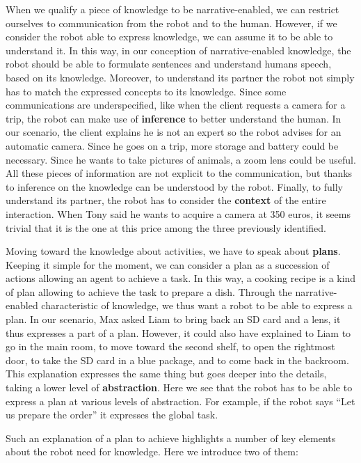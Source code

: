 When we qualify a piece of knowledge to be narrative-enabled, we can restrict ourselves to communication from the robot and to the human. However, if we consider the robot able to express knowledge, we can assume it to be able to understand it. In this way, in our conception of narrative-enabled knowledge, the robot should be able to formulate sentences and understand humans speech, based on its knowledge. Moreover, to understand its partner the robot not simply has to match the expressed concepts to its knowledge. Since some communications are underspecified, like when the client requests a camera for a trip, the robot can make use of \textbf{inference} to better understand the human. In our scenario, the client explains he is not an expert so the robot advises for an automatic camera. Since he goes on a trip, more storage and battery could be necessary. Since he wants to take pictures of animals, a zoom lens could be useful. All these pieces of information are not explicit to the communication, but thanks to inference on the knowledge can be understood by the robot. Finally, to fully understand its partner, the robot has to consider the \textbf{context} of the entire interaction. When Tony said he wants to acquire a camera at 350 euros, it seems trivial that it is the one at this price among the three previously identified.

Moving toward the knowledge about activities, we have to speak about \textbf{plans}. Keeping it simple for the moment, we can consider a plan as a succession of actions allowing an agent to achieve a task. In this way, a cooking recipe is a kind of plan allowing to achieve the task to prepare a dish. Through the narrative-enabled characteristic of knowledge, we thus want a robot to be able to express a plan. In our scenario, Max asked Liam to bring back an SD card and a lens, it thus expresses a part of a plan. However, it could also have explained to Liam to go in the main room, to move toward the second shelf, to open the rightmost door, to take the SD card in a blue package, and to come back in the backroom. This explanation expresses the same thing but goes deeper into the details, taking a lower level of \textbf{abstraction}. Here we see that the robot has to be able to express a plan at various levels of abstraction. For example, if the robot says ``Let us prepare the order'' it expresses the global task.

Such an explanation of a plan to achieve highlights a number of key elements about the robot need for knowledge. Here we introduce two of them:

